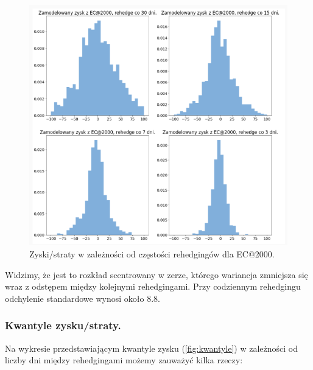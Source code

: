 \documentclass[12pt]{article}
\begin{document}
\begin{figure}[H]
    \centering
    \includegraphics[width=\textwidth,height=\textheight,keepaspectratio]{hist_rehedge_freq.png}
    \caption{Zyski/straty w zależności od częstości rehedgingów dla EC@2000.}
    \label{fig:hist_all}
\end{figure}

Widzimy, że jest to rozkład scentrowany w zerze, którego wariancja zmniejsza się wraz z odstępem między kolejnymi rehedgingami. Przy codziennym rehedgingu odchylenie standardowe wynosi około 8.8.\\
\subsubsection{Kwantyle zysku/straty.}
Na wykresie przedstawiającym kwantyle zysku (\ref{fig:kwantyle}) w zależności od liczby dni między rehedgingami możemy zauważyć kilka rzeczy:
\end{document}
